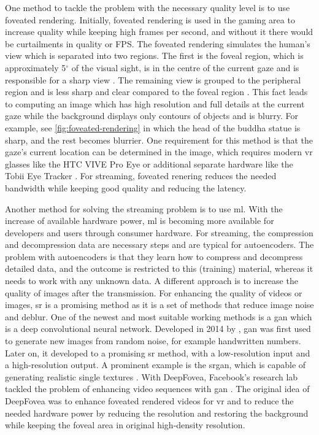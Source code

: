 \par
One method to tackle the problem with the necessary quality level is to use foveated rendering. Initially, foveated rendering is used in the gaming area to increase quality while keeping high frames per second, and without it there would be curtailments in quality or FPS. The foveated rendering simulates the human’s view which is separated into two regions. The first is the foveal region, which is approximately 5$^{\circ}$ of the visual sight, is in the centre of the current gaze and is responsible for a sharp view \parencite{Yanoff2020}. The remaining view is grouped to the peripheral region and is less sharp and clear compared to the foveal region \parencite{Yanoff2020}. This fact leads to computing an image which has high resolution and full details at the current gaze while the background displays only contours of objects and is blurry. For example, see \autoref{fig:foveated-rendering} in which the head of the buddha statue is sharp, and the rest becomes blurrier. One requirement for this method is that the gaze’s current location can be determined in the image, which requires modern \gls{vr} glasses like the HTC VIVE Pro Eye \parencite{HTCVIVEProEye2020} or additional separate hardware like the Tobii Eye Tracker \parencite{TobiiTracker2020}. For streaming, foveated renering reduces the needed bandwidth while keeping good quality and reducing the latency.
\par
Another method for solving the streaming problem is to use \gls{ml}. With the increase of available hardware power, \gls{ml} is becoming more available for developers and users through consumer hardware. For streaming, the compression and decompression data are necessary steps and are typical for autoencoders. The problem with autoencoders is that they learn how to compress and decompress detailed data, and the outcome is restricted to this (training) material, whereas it needs to work with any unknown data. A different approach is to increase the quality of images after the transmission. For enhancing the quality of videos or images, \gls{sr} is a promising method as it is a set of methods that reduce image noise and deblur. One of the newest and most suitable working methods is a \gls{gan} which is a deep convolutional neural network. Developed in 2014 by \citeauthor{Goodfellow2014}, \gls{gan} was first used to generate new images from random noise, for example handwritten numbers. Later on, it developed to a promising \gls{sr} method, with a low-resolution input and a high-resolution output. A prominent example is the \gls{srgan}, which is capable of generating realistic single textures \parencite{Ledig2017}. With DeepFovea, Facebook’s research lab tackled the problem of enhancing video sequences with \gls{gan} \parencite{Kaplanyan2019}. The original idea of DeepFovea was to enhance foveated rendered videos for \gls{vr} and to reduce the needed hardware power by reducing the resolution and restoring the background while keeping the foveal area in original high-density resolution.
